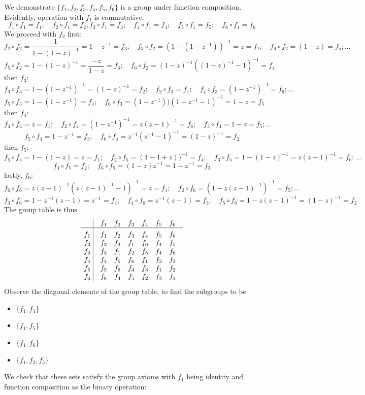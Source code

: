 \documentclass[a4paper]{article}
\begin{document}
\begin{ans}
We demonstrate $\{f_1,f_2,f_3,f_4,f_5,f_6\}$ is a group under function composition. Evidently, operation with $f_1$ is commutative.
$$f_1\circ f_1=f_1;\quad f_2\circ f_1=f_2; f_3\circ f_1=f_3;\quad f_4\circ f_1=f_4;\quad f_5\circ f_1=f_5;\quad f_6\circ f_1=f_6$$
We proceed with $f_2$ first:
$$f_2\circ f_2=\frac{1}{1-(1-z)^{-1}}=1-z^{-1}=f_3;\quad f_3\circ f_2=(1-(1-z^{-1}))^{-1}=z=f_1;\quad f_4\circ f_2=(1-z)=f_5;...$$
$$f_5\circ f_2=1-(1-z)^{-1}=\frac{-z}{1-z}=f_6;\quad f_6\circ f_2=(1-z)^{-1}((1-z)^{-1}-1)^{-1}=f_4$$
then $f_3$:
$$f_3\circ f_3=1-(1-z^{-1})^{-1}=(1-z)^{-1}=f_2;\quad f_2\circ f_3=f_1;\quad f_4\circ f_3=(1-z^{-1})^{-1}=f_6;...$$
$$f_5\circ f_3=1-(1-z^{-1})=f_4;\quad f_6\circ f_3=(1-z^{-1}))(1-z^{-1}-1)^{-1}=1-z=f_5$$
then $f_4$:
$$f_4\circ f_4=z=f_1;\quad f_2\circ f_4=(1-z^{-1})^{-1}=z(z-1)^{-1}=f_6;\quad f_3\circ f_4=1-z=f_5;...$$
$$f_5\circ f_4=1-z^{-1}=f_3;\quad f_6\circ f_4=z^{-1}(z^{-1}-1)^{-1}=(1-z)^{-1}=f_2$$
then $f_5$:
$$f_5\circ f_5=1-(1-z)=z=f_1;\quad f_2\circ f_5=(1-1+z))^{-1}=f_4;\quad f_3\circ f_5=1-(1-z)^{-1}=z(z-1)^{-1}=f_6;...$$
$$f_4\circ f_5=f_2;\quad f_6\circ f_5=(1-z)z^{-1}=1-z^{-1}=f_3$$
lastly, $f_6$:
$$f_6\circ f_6=z(z-1)^{-1}(z(z-1)^{-1}-1)^{-1}=z=f_1;\quad f_2\circ f_6=(1-z(z-1)^{-1})^{-1}=f_5;...$$
$$f_3\circ f_6=1-z^{-1}(z-1)=z^{-1}=f_4;\quad f_4\circ f_6=z^{-1}(z-1)=f_3;\quad f_5\circ f_6=1-z(z-1)^{-1}=(1-z)^{-1}=f_2$$
The group table is thus
$$\vbox{\tabskip0.5em\offinterlineskip
    \halign{\strut$#$\hfil\ \tabskip1em\vrule&&$#$\hfil\cr
    ~   & f_1   & f_2   & f_3 & f_4 & f_5 & f_6     \cr
    \noalign{\hrule}\vrule height 12pt width 0pt
    f_1   & f_1   & f_2  & f_3 & f_4 & f_5 & f_6      \cr
    f_2   & f_2  &f_3   & f_1 & f_6   & f_4 & f_5      \cr
    f_3 & f_3 & f_1   & f_2   & f_5 & f_4 & f_6      \cr
    f_4   & f_4   & f_5   & f_6   & f_1 & f_2 & f_3     \cr
    f_5   & f_5   & f_6   & f_4   & f_3 & f_1 & f_2     \cr
    f_6   & f_6   & f_4   &  f_5  & f_2 & f_3 & f_1     \cr
}}$$
Observe the diagonal elements of the group table, to find the subgroups to be
\begin{itemize}
    \item $\{f_1,f_4\}$
    \item $\{f_1,f_5\}$
    \item $\{f_1,f_6\}$
    \item $\{f_1,f_2,f_3\}$
\end{itemize}
We check that these sets satisfy the group axioms with $f_1$ being identity and function composition as the binary operation:\\[5pt]

\end{ans}
\end{document}
